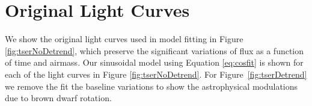 \documentclass[twocolumn]{aastex6}
\begin{document}
\appendix

\section{Original Light Curves}

We show the original light curves used in model fitting in Figure \ref{fig:tserNoDetrend}, which preserve the significant variations of flux as a function of time and airmass.
Our sinusoidal model using Equation \ref{eq:cosfit} is shown for each of the light curves in Figure \ref{fig:tserNoDetrend}.
For Figure~\ref{fig:tserDetrend} we remove the fit the baseline variations to show the astrophysical modulations due to brown dwarf rotation.

\begin{figure}[!t]
\centering
{}
\end{figure}
\end{document}
